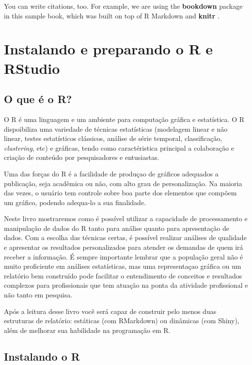 \documentclass[
]{book}
\begin{document}
You can write citations, too. For example, we are using the \textbf{bookdown} package \citep{R-bookdown} in this sample book, which was built on top of R Markdown and \textbf{knitr} \citep{xie2015}.

\hypertarget{instalando}{%
\chapter{Instalando e preparando o R e RStudio}\label{instalando}}

\hypertarget{o-que-uxe9-o-r}{%
\section{O que é o R?}\label{o-que-uxe9-o-r}}

O R é uma linguagem e um ambiente para computação gráfica e estatística. O R dispoibiliza uma variedade de técnicas estatísticas (modelagem linear e não linear, testes estatísticos clássicos, análise de série temporal, classificação, \emph{clustering}, etc) e gráficas, tendo como caractéristica principal a colaboração e criação de conteúdo por pesquisadores e entusiastas.

Uma das forças do R é a facilidade de produçao de gráficos adequados a publicação, seja acadêmica ou não, com alto grau de personalização. Na maioria das vezes, o usuário tem controle sobre boa parte dos elementos que compõem um gráfico, podendo adequa-lo a sua finalidade.

Neste livro mostraremos como é possível utilizar a capacidade de processamento e manipulação de dados do R tanto para análise quanto para apresentação de dados. Com a escolha das técnicas certas, é possível realizar análises de qualidade e apresentar os resultados personalizados para atender os demandas de quem irá receber a informação. É sempre importante lembrar que a população geral não é muito proficiente em análises estatísticas, mas uma representaçao gráfica ou um relatório bem construído pode facilitar o entendimento de conceitos e resultados complexos para profissionais que tem atuação na ponta da atividade profissional e não tanto em pesquisa.

Após a leitura desse livro você será capaz de construir pelo menos duas estruturas de relatório: estáticas (com RMarkdown) ou dinâmicas (com Shiny), além de melhorar sua habilidade na programação em R.

\hypertarget{instalando-o-r}{%
\section{Instalando o R}\label{instalando-o-r}}
\end{document}
